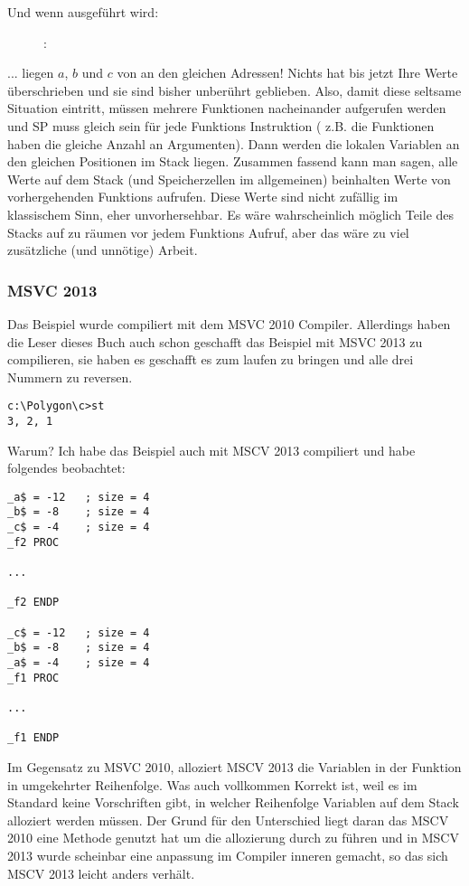 \clearpage
Und wenn  ausgeführt wird:

\begin{figure}[H]
\centering
{}
\caption{\olly: }
\label{fig:stack_noise_olly2}
\end{figure}

... liegen $a$, $b$ und $c$ von   an den gleichen Adressen!
Nichts hat bis jetzt Ihre Werte überschrieben und sie sind bisher
unberührt geblieben. Also, damit diese seltsame Situation eintritt, müssen
mehrere Funktionen nacheinander aufgerufen werden und \ac{SP} muss gleich 
sein für jede Funktions Instruktion ( z.B. die Funktionen haben die 
gleiche Anzahl an Argumenten). Dann werden die lokalen Variablen an den
gleichen Positionen im Stack liegen. Zusammen fassend kann man sagen, alle
Werte auf dem Stack (und Speicherzellen im allgemeinen) beinhalten Werte
von vorhergehenden Funktions aufrufen. Diese Werte sind nicht zufällig 
im klassischem Sinn, eher unvorhersehbar. Es wäre wahrscheinlich möglich 
Teile des Stacks auf zu räumen vor jedem Funktions Aufruf, aber das wäre
zu viel zusätzliche (und unnötige) Arbeit. 

\subsubsection{MSVC 2013}

Das Beispiel wurde compiliert mit dem MSVC 2010 Compiler.
Allerdings haben die Leser dieses Buch auch schon geschafft das Beispiel mit MSVC 2013 zu compilieren, sie haben es geschafft es zum laufen zu bringen und alle drei Nummern zu reversen.

\begin{lstlisting}
c:\Polygon\c>st
3, 2, 1
\end{lstlisting}

Warum? 
Ich habe das Beispiel auch mit MSCV 2013 compiliert und habe folgendes beobachtet:

\begin{lstlisting}[caption=MSVC 2013,style=customasm]
_a$ = -12	; size = 4
_b$ = -8	; size = 4
_c$ = -4	; size = 4
_f2	PROC

...

_f2	ENDP

_c$ = -12	; size = 4
_b$ = -8	; size = 4
_a$ = -4	; size = 4
_f1	PROC

...

_f1	ENDP
\end{lstlisting}

Im Gegensatz zu MSVC 2010, alloziert MSCV 2013 die Variablen in der Funktion  in umgekehrter Reihenfolge.%
Was auch vollkommen Korrekt ist, weil es im \CCpp Standard keine Vorschriften gibt, in welcher Reihenfolge Variablen auf dem Stack alloziert werden müssen. Der Grund für den Unterschied liegt daran das MSCV 2010 eine Methode genutzt hat um  die allozierung durch zu führen und in MSCV 2013 wurde scheinbar eine anpassung im Compiler inneren gemacht, so das sich MSCV 2013 leicht anders verhält.


